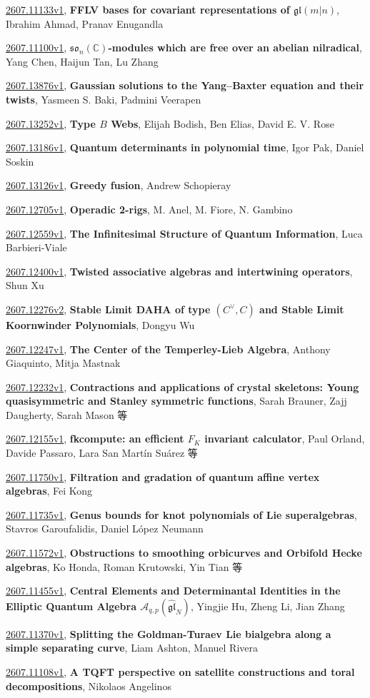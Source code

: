 \documentclass[9pt, a4paper]{article}
\theoremstyle{plain}
\theoremstyle{definition}
\theoremstyle{remark}
\newcommand{\arxiv}[3]{\href{https://arxiv.org/abs/#1}{#1}, \textbf{\textcolor{arxivblue}{#2}}, #3}
\begin{document}
\arxiv{2607.11133v1}{FFLV bases for covariant representations of $\mathfrak{gl}(m|n)$}{Ibrahim Ahmad, Pranav Enugandla}

\arxiv{2607.11100v1}{$\mathfrak{so}_n(\mathbb{C})$-modules which are free over an abelian nilradical}{Yang Chen, Haijun Tan, Lu Zhang}

\arxiv{2607.13876v1}{Gaussian solutions to the Yang--Baxter equation and their twists}{Yasmeen S. Baki, Padmini Veerapen}

\arxiv{2607.13252v1}{Type $B$ Webs}{Elijah Bodish, Ben Elias, David E. V. Rose}

\arxiv{2607.13186v1}{Quantum determinants in polynomial time}{Igor Pak, Daniel Soskin}

\arxiv{2607.13126v1}{Greedy fusion}{Andrew Schopieray}

\arxiv{2607.12705v1}{Operadic 2-rigs}{M. Anel, M. Fiore, N. Gambino}

\arxiv{2607.12559v1}{The Infinitesimal Structure of Quantum Information}{Luca Barbieri-Viale}

\arxiv{2607.12400v1}{Twisted associative algebras and intertwining operators}{Shun Xu}

\arxiv{2607.12276v2}{Stable Limit DAHA of type $(C^{\vee},C)$ and Stable Limit Koornwinder Polynomials}{Dongyu Wu}

\arxiv{2607.12247v1}{The Center of the Temperley-Lieb Algebra}{Anthony Giaquinto, Mitja Mastnak}

\arxiv{2607.12232v1}{Contractions and applications of crystal skeletons: Young quasisymmetric and Stanley symmetric functions}{Sarah Brauner, Zajj Daugherty, Sarah Mason 等}

\arxiv{2607.12155v1}{fkcompute: an efficient $F_K$ invariant calculator}{Paul Orland, Davide Passaro, Lara San Martín Suárez 等}

\arxiv{2607.11750v1}{Filtration and gradation of quantum affine vertex algebras}{Fei Kong}

\arxiv{2607.11735v1}{Genus bounds for knot polynomials of Lie superalgebras}{Stavros Garoufalidis, Daniel López Neumann}

\arxiv{2607.11572v1}{Obstructions to smoothing orbicurves and Orbifold Hecke algebras}{Ko Honda, Roman Krutowski, Yin Tian 等}

\arxiv{2607.11455v1}{Central Elements and Determinantal Identities in the Elliptic Quantum Algebra \( \mathcal{A}_{q,p}(\widehat{\mathfrak{gl}}_N)\)}{Yingjie Hu, Zheng Li, Jian Zhang}

\arxiv{2607.11370v1}{Splitting the Goldman-Turaev Lie bialgebra along a simple separating curve}{Liam Ashton, Manuel Rivera}

\arxiv{2607.11108v1}{A TQFT perspective on satellite constructions and toral decompositions}{Nikolaos Angelinos}

\end{document}
